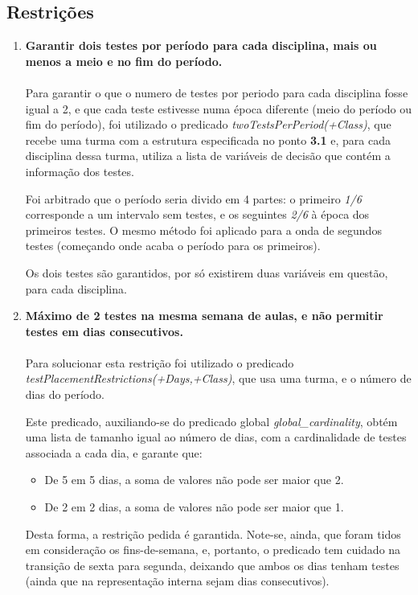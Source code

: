 \documentclass{llncs}
\begin{document}
\subsection{Restrições} 
\begin{enumerate}

	\item \textbf{Garantir dois testes por período para cada disciplina, mais ou menos a meio e no fim do período.}\\\\
		Para garantir o que o numero de testes por periodo para cada disciplina fosse igual a 2, e que cada teste estivesse numa época diferente (meio do período ou fim do período), foi utilizado o predicado 	               
		\textit{twoTestsPerPeriod(+Class)}, que recebe uma turma com a estrutura especificada no ponto  \textbf{3.1} e, para cada disciplina dessa turma, utiliza a lista de variáveis de decisão que contém a informação dos testes.\par 
Foi arbitrado que o período seria divido em 4 partes: o primeiro \textit{1/6} corresponde a um intervalo sem testes, e os seguintes \textit{2/6} à época dos primeiros testes. O mesmo método foi aplicado para a onda de segundos testes (começando onde acaba o período para os primeiros).\par
		Os dois testes são garantidos, por só existirem duas variáveis em questão, para cada disciplina.
		\\
	
\newpage
			
	\item \textbf{Máximo de 2 testes na mesma semana de aulas, e não permitir testes em dias consecutivos.} \\\\
		Para solucionar esta restrição foi utilizado o predicado \textit{testPlacementRestrictions(+Days,+Class)}, que usa uma turma, e o número de dias do período.\par
		Este predicado, auxiliando-se do predicado global \textit{global\_cardinality}, obtém uma lista de tamanho igual ao número de dias, com a cardinalidade de testes associada a cada dia, e garante que:
		\begin{itemize}
			\item De 5 em 5 dias, a soma de valores não pode ser maior que 2.
			\item De 2 em 2 dias, a soma de valores não pode ser maior que 1.
		\end{itemize}
		Desta forma, a restrição pedida é garantida. Note-se, ainda, que foram tidos em consideração os fins-de-semana, e, portanto, o predicado tem cuidado na transição de sexta para segunda, deixando que ambos os dias tenham testes (ainda que na representação interna sejam dias consecutivos).
		\\


\end{enumerate}
\end{document}
